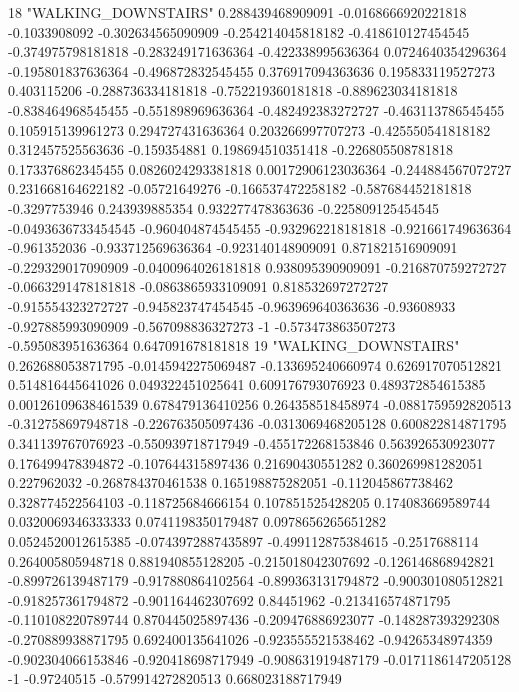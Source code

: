 18 "WALKING_DOWNSTAIRS" 0.288439468909091 -0.0168666920221818 -0.1033908092 -0.302634565090909 -0.254214045818182 -0.418610127454545 -0.374975798181818 -0.283249171636364 -0.422338995636364 0.0724640354296364 -0.195801837636364 -0.496872832545455 0.376917094363636 0.195833119527273 0.403115206 -0.288736334181818 -0.752219360181818 -0.889623034181818 -0.838464968545455 -0.551898969636364 -0.482492383272727 -0.463113786545455 0.105915139961273 0.294727431636364 0.203266997707273 -0.425550541818182 0.312457525563636 -0.159354881 0.198694510351418 -0.226805508781818 0.173376862345455 0.0826024293381818 0.00172906123036364 -0.244884567072727 0.231668164622182 -0.05721649276 -0.166537472258182 -0.587684452181818 -0.3297753946 0.243939885354 0.932277478363636 -0.225809125454545 -0.0493636733454545 -0.960404874545455 -0.932962218181818 -0.921661749636364 -0.961352036 -0.933712569636364 -0.923140148909091 0.871821516909091 -0.229329017090909 -0.0400964026181818 0.938095390909091 -0.216870759272727 -0.0663291478181818 -0.0863865933109091 0.818532697272727 -0.915554323272727 -0.945823747454545 -0.963969640363636 -0.93608933 -0.927885993090909 -0.567098836327273 -1 -0.573473863507273 -0.595083951636364 0.647091678181818
19 "WALKING_DOWNSTAIRS" 0.262688053871795 -0.0145942275069487 -0.133695240660974 0.626917070512821 0.514816445641026 0.049322451025641 0.609176793076923 0.489372854615385 0.00126109638461539 0.678479136410256 0.264358518458974 -0.0881759592820513 -0.312758697948718 -0.226763505097436 -0.0313069468205128 0.600822814871795 0.341139767076923 -0.550939718717949 -0.455172268153846 0.563926530923077 0.176499478394872 -0.107644315897436 0.21690430551282 0.360269981282051 0.227962032 -0.268784370461538 0.165198875282051 -0.112045867738462 0.328774522564103 -0.118725684666154 0.107851525428205 0.174083669589744 0.0320069346333333 0.0741198350179487 0.0978656265651282 0.0524520012615385 -0.0743972887435897 -0.499112875384615 -0.2517688114 0.264005805948718 0.881940855128205 -0.215018042307692 -0.126146868942821 -0.899726139487179 -0.917880864102564 -0.899363131794872 -0.900301080512821 -0.918257361794872 -0.901164462307692 0.84451962 -0.213416574871795 -0.110108220789744 0.870445025897436 -0.209476886923077 -0.148287393292308 -0.270889938871795 0.692400135641026 -0.923555521538462 -0.94265348974359 -0.902304066153846 -0.920418698717949 -0.908631919487179 -0.0171186147205128 -1 -0.97240515 -0.579914272820513 0.668023188717949
